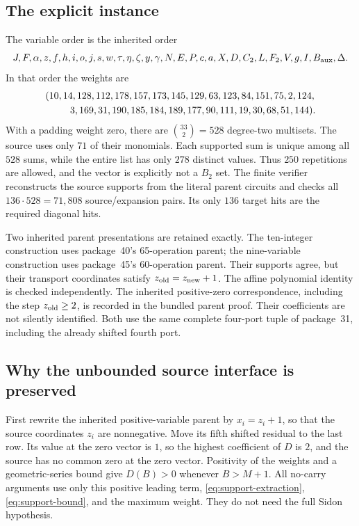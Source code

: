 \subsection{The explicit instance}
The variable order is the inherited order
\[
 J,F,\alpha,z,f,h,i,o,j,s,w,\tau,\eta,\zeta,y,\gamma,
 N,E,P,c,a,X,D,C_2,L,F_2,V,g,I,B_{\rm aux},\Delta.
\]
In that order the weights are
\begin{align*}
 &(10,14,128,112,178,157,173,145,129,63,123,84,151,75,2,124,\\
 &\hspace{9mm}3,169,31,190,185,184,189,177,90,111,19,30,68,51,144).
\end{align*}
With a padding weight zero, there are $\binom{33}{2}=528$ degree-two
multisets. The source uses only $71$ of their monomials. Each supported
sum is unique among all $528$ sums, while the entire list has only $278$
distinct values. Thus $250$ repetitions are allowed, and the vector is
explicitly not a $B_2$ set. The finite verifier reconstructs the source
supports from the literal parent circuits and checks all
$136\cdot528=71{,}808$ source/expansion pairs. Its only $136$ target hits
are the required diagonal hits.

Two inherited parent presentations are retained exactly. The ten-integer
construction uses package~40's 65-operation parent; the nine-variable
construction uses package~45's 60-operation parent. Their supports agree,
but their transport coordinates satisfy $z_{\rm old}=z_{\rm new}+1$.
The affine polynomial identity is checked independently. The inherited
positive-zero correspondence, including the step $z_{\rm old}\geq2$, is
recorded in the bundled parent proof. Their coefficients are not silently
identified. Both use the same complete four-port tuple of package~31,
including the already shifted fourth port.

\subsection{Why the unbounded source interface is preserved}
First rewrite the inherited positive-variable parent by $x_i=z_i+1$, so
that the source coordinates $z_i$ are nonnegative. Move its fifth shifted
residual to the last row. Its value at the zero vector is $1$, so the highest coefficient of $D$ is $2$, and the source
has no common zero at the zero vector. Positivity of the weights and a
geometric-series bound give $D(B)>0$ whenever $B>M+1$.
All no-carry arguments use only this positive leading term,
\eqref{eq:support-extraction}, \eqref{eq:support-bound}, and the maximum
weight. They do not need the full Sidon hypothesis.

